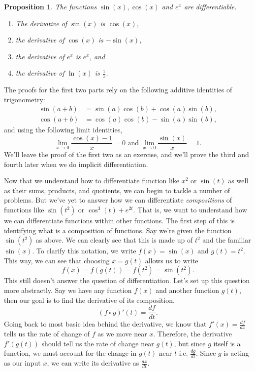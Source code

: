 \documentclass[12pt]{article}
\newcommand{\diff}[2]{\frac{d #1}{d #2} }
\newtheorem{prop}[thm]{Proposition}
\theoremstyle{definition}
\theoremstyle{plain}
\numberwithin{equation}{section}
\begin{document}
\begin{prop}\label{SinCosExpDif}
  The functions $\sin(x), \cos(x)$ and $e^x$ are differentiable.
  \begin{enumerate}
\item The derivative of $\sin(x)$ is $\cos(x)$,
\item the derivative of $\cos(x)$ is $-\sin(x)$,
\item the derivative of $e^x$ is $e^x$, and
\item the derivative of $\ln(x)$ is $\frac{1}{x}$.
\end{enumerate}
\end{prop}
The proofs for the first two parts rely on the following additive identities of trigonometry:
\begin{align}
   \sin(a+b)&=\sin(a)\cos(b)+\cos(a)\sin(b),\\
   \cos(a+b)&=\cos(a)\cos(b)-\sin(a)\sin(b),
\end{align}
and using the following limit identities,
\begin{equation}
  \lim\limits_{x\to 0}\frac{\cos(x)-1}{x}=0 \text{ and } \lim\limits_{x\to 0}\frac{\sin(x)}{x} =1.
\end{equation}
We'll leave the proof of the first two as an exercise, and we'll prove the third and fourth later when we do implicit differentiation.

Now that we understand how to differentiate function like $x^2$ or $\sin(t)$ as well as their sums, products, and quotients, we can begin to tackle a number of problems. But we've yet to answer how we can differentiate \emph{compositions} of functions like $\sin(t^2)$ or $\cos^3(t) + e^{2t}$. That is, we want to understand how we can differentiate functions within other functions. The first step of this is identifying what is a composition of functions. Say we're given the function $\sin(t^2)$ as above. We can clearly see that this is made up of $t^2$ and the familiar $\sin(x)$. To clarify this notation, we write $f(x) = \sin(x)$ and $g(t) = t^2$.  This way, we can see that choosing $x = g(t)$ allows us to write
\[
f(x) = f(g(t)) = f(t^2) = \sin (t^2).
\]
This still doesn't answer the question of differentiation. Let's set up this question more abstractly. Say we have any function $f(x)$ and another function $g(t)$, then our goal is to find the derivative of its composition,
\[
(f\circ g)'(t) = \frac{df}{dt}.
\]
Going back to most basic idea behind the derivative, we know that $f'(x) = \diff{f}{x}$ tells us the rate of change of $f$ as we move near $x$. Therefore, the derivative $f'(g(t))$ should tell us the rate of change near $g(t)$, but since $g$ itself is a function, we must account for the change in $g(t)$ near $t$ i.e. $\diff{g}{t}$. Since $g$ is acting as our input $x$, we can write its derivative as $\diff{x}{t}$.
\end{document}
